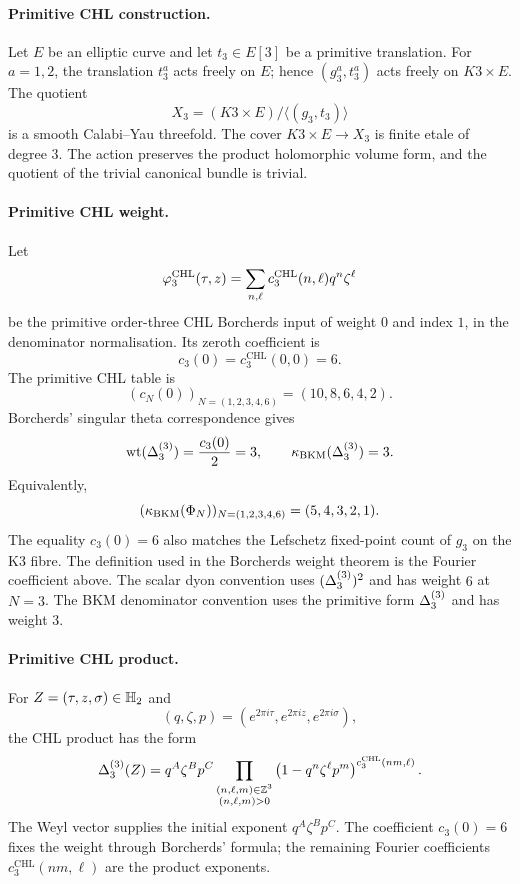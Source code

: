 \paragraph{Primitive CHL construction.}
Let \(E\) be an elliptic curve and let \(t_3\in E[3]\) be a primitive
translation.  For \(a=1,2\), the translation \(t_3^a\) acts freely on
\(E\); hence \((g_3^a,t_3^a)\) acts freely on \(K3\times E\).  The
quotient
\[
  X_3=(K3\times E)/\langle(g_3,t_3)\rangle
\]
is a smooth Calabi--Yau threefold.  The cover \(K3\times E\to X_3\) is
finite etale of degree \(3\).  The action preserves the product
holomorphic volume form, and the quotient of the trivial canonical
bundle is trivial.

\paragraph{Primitive CHL weight.}
Let
\[
  \varphi_{3}^{\mathrm{CHL}}(\tau,z)
  =
  \sum_{n,\ell}c^{\mathrm{CHL}}_3(n,\ell)q^n\zeta^\ell
\]
be the primitive order-three CHL Borcherds input of weight \(0\) and
index \(1\), in the denominator normalisation.  Its zeroth coefficient is
\[
  c_3(0)=c^{\mathrm{CHL}}_3(0,0)=6.
\]
The primitive CHL table is
\[
  (c_N(0))_{N=(1,2,3,4,6)}=(10,8,6,4,2).
\]
Borcherds' singular theta correspondence gives
\[
  \operatorname{wt}(\Delta_{3}^{(3)})
  =\frac{c_3(0)}{2}=3,
  \qquad
  \kappa_{\mathrm{BKM}}(\Delta_{3}^{(3)})=3.
\]
Equivalently,
\[
  (\kappa_{\mathrm{BKM}}(\Phi_N))_{N=(1,2,3,4,6)}=(5,4,3,2,1).
\]
The equality \(c_3(0)=6\) also matches the Lefschetz fixed-point count
of \(g_3\) on the K3 fibre.  The definition used in the Borcherds
weight theorem is the Fourier coefficient above.
The scalar dyon convention uses \((\Delta_{3}^{(3)})^2\) and has weight
\(6\) at \(N=3\).  The BKM denominator convention uses the primitive
form \(\Delta_{3}^{(3)}\) and has weight \(3\).

\paragraph{Primitive CHL product.}
For \(Z=(\tau,z,\sigma)\in\mathbb{H}_{2}\) and
\[
  (q,\zeta,p)
  =
  (e^{2\pi i\tau},e^{2\pi iz},e^{2\pi i\sigma}),
\]
the CHL product has the form
\[
  \Delta_{3}^{(3)}(Z)
  =
  q^A\zeta^B p^C
  \prod_{\substack{(n,\ell,m)\in\mathbb{Z}^3\\(n,\ell,m)>0}}
  \left(1-q^n\zeta^\ell p^m\right)^{
    c^{\mathrm{CHL}}_3(nm,\ell)} .
\]
The Weyl vector supplies the initial exponent \(q^A\zeta^B p^C\).
The coefficient \(c_3(0)=6\) fixes the weight through
Borcherds' formula; the remaining Fourier coefficients
\(c^{\mathrm{CHL}}_3(nm,\ell)\) are the product exponents.

